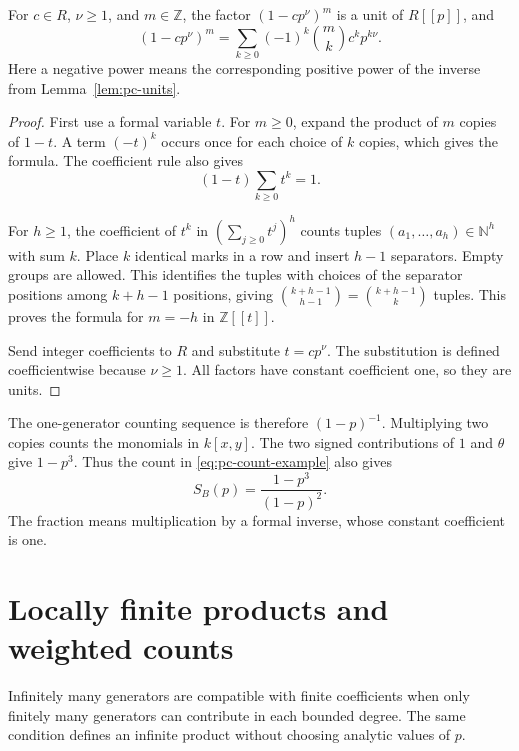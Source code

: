 \begin{lemma}
\label{lem:pc-binomial}
For $c\in R$, $\nu\geq1$, and $m\in\mathbb Z$, the factor
$(1-cp^\nu)^m$ is a unit of $R[[p]]$, and
\[
 (1-cp^\nu)^m
   =\sum_{k\geq0}(-1)^k\binom{m}{k}c^k p^{k\nu}.
\]
Here a negative power means the corresponding positive power of the
inverse from Lemma~\ref{lem:pc-units}.
\end{lemma}

\begin{proof}
First use a formal variable $t$. For $m\geq0$, expand the product of $m$
copies of $1-t$. A term $(-t)^k$ occurs once for each choice of $k$ copies,
which gives the formula.
The coefficient rule also gives
\[
 (1-t)\sum_{k\geq0}t^k=1.
\]

For $h\geq1$, the coefficient of $t^k$ in
$(\sum_{j\geq0}t^j)^h$ counts tuples
$(a_1,\ldots,a_h)\in\mathbb N^h$ with sum $k$.
Place $k$ identical marks in a row and insert $h-1$ separators.
Empty groups are allowed. This identifies the tuples with choices of
the separator positions among $k+h-1$ positions, giving
$\binom{k+h-1}{h-1}=\binom{k+h-1}{k}$ tuples.
This proves the formula for $m=-h$ in $\mathbb Z[[t]]$.

Send integer coefficients to $R$ and substitute $t=cp^\nu$.
The substitution is defined coefficientwise because $\nu\geq1$.
All factors have constant coefficient one, so they are units.
\end{proof}

The one-generator counting sequence is therefore $(1-p)^{-1}$.
Multiplying two copies counts the monomials in $k[x,y]$.
The two signed contributions of $1$ and $\theta$ give $1-p^3$.
Thus the count in \eqref{eq:pc-count-example} also gives
\begin{equation}
 S_B(p)=\frac{1-p^3}{(1-p)^2}.
 \label{eq:pc-rational-example}
\end{equation}
The fraction means multiplication by a formal inverse, whose constant
coefficient is one.

\section{Locally finite products and weighted counts}

Infinitely many generators are compatible with finite coefficients when
only finitely many generators can contribute in each bounded degree.
The same condition defines an infinite product without choosing analytic
values of $p$.

